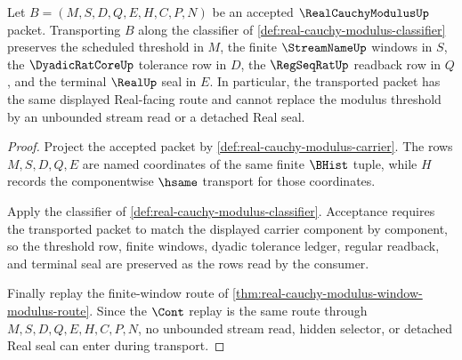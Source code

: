 \begin{theorem}
\label{thm:real-cauchy-modulus-threshold-stability}
Let $B=(M,S,D,Q,E,H,C,P,N)$ be an accepted $\RealCauchyModulusUp$ packet. Transporting $B$ along the classifier of \autoref{def:real-cauchy-modulus-classifier} preserves the scheduled threshold in $M$, the finite $\StreamNameUp$ windows in $S$, the $\DyadicRatCoreUp$ tolerance row in $D$, the $\RegSeqRatUp$ readback row in $Q$, and the terminal $\RealUp$ seal in $E$. In particular, the transported packet has the same displayed Real-facing route and cannot replace the modulus threshold by an unbounded stream read or a detached Real seal.
\end{theorem}
\begin{proof}
Project the accepted packet by \autoref{def:real-cauchy-modulus-carrier}. The rows $M,S,D,Q,E$ are named coordinates of the same finite $\BHist$ tuple, while $H$ records the componentwise $\hsame$ transport for those coordinates.

Apply the classifier of \autoref{def:real-cauchy-modulus-classifier}. Acceptance requires the transported packet to match the displayed carrier component by component, so the threshold row, finite windows, dyadic tolerance ledger, regular readback, and terminal seal are preserved as the rows read by the consumer.

Finally replay the finite-window route of \autoref{thm:real-cauchy-modulus-window-modulus-route}. Since the $\Cont$ replay is the same route through $M,S,D,Q,E,H,C,P,N$, no unbounded stream read, hidden selector, or detached Real seal can enter during transport.
\end{proof}

